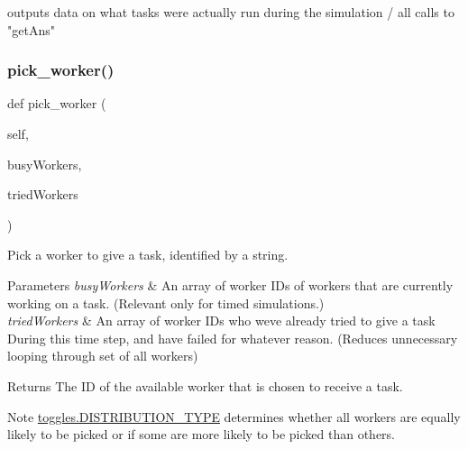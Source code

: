 \begin{DoxyVerb}outputs data on what tasks were actually run during the simulation / all calls to "getAns" \end{DoxyVerb}
 \mbox{\label{classdynamicfilterapp_1_1test__simulations_1_1_simulation_test_acb17139f8e2f7a4b835ec1c05400e8c2}} 
\subsubsection{\texorpdfstring{pick\+\_\+worker()}{pick\_worker()}}
{\footnotesize\ttfamily def pick\+\_\+worker (\begin{DoxyParamCaption}\item[{}]{self,  }\item[{}]{busy\+Workers,  }\item[{}]{tried\+Workers }\end{DoxyParamCaption})}



Pick a worker to give a task, identified by a string. 


\begin{DoxyParams}{Parameters}
{\em busy\+Workers} & An array of worker I\+Ds of workers that are currently working on a task. (Relevant only for timed simulations.) \\
\hline
{\em tried\+Workers} & An array of worker I\+Ds who we\textquotesingle{}ve already tried to give a task During this time step, and have failed for whatever reason. (Reduces unnecessary looping through set of all workers) \\
\hline
\end{DoxyParams}
\begin{DoxyReturn}{Returns}
The ID of the available worker that is chosen to receive a task. 
\end{DoxyReturn}
\begin{DoxyNote}{Note}
\hyperlink{namespacedynamicfilterapp_1_1toggles_aceed21fa0675802d2f756c7da43cb049}{toggles.\+D\+I\+S\+T\+R\+I\+B\+U\+T\+I\+O\+N\+\_\+\+T\+Y\+PE} determines whether all workers are equally likely to be picked or if some are more likely to be picked than others. 
\end{DoxyNote}
\mbox{\label{classdynamicfilterapp_1_1test__simulations_1_1_simulation_test_ac0c6db97fdb6cea1796780b48515cb30}} 
